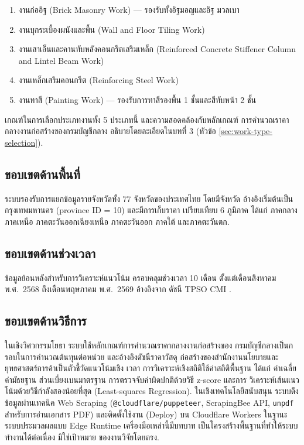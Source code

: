 \begin{enumerate}[leftmargin=2em,itemsep=0.2em]
  \item งานก่ออิฐ (Brick Masonry Work) — รองรับทั้งอิฐมอญและอิฐ
        มวลเบา
  \item งานบุกระเบื้องผนังและพื้น (Wall and Floor Tiling Work)
  \item งานเสาเอ็นและคานทับหลังคอนกรีตเสริมเหล็ก (Reinforced Concrete
        Stiffener Column and Lintel Beam Work)
  \item งานเหล็กเสริมคอนกรีต (Reinforcing Steel Work)
  \item งานทาสี (Painting Work) — รองรับการทาสีรองพื้น 1 ชั้นและสีทับหน้า
        2 ชั้น
\end{enumerate}

เกณฑ์ในการเลือกประเภทงานทั้ง 5 ประเภทนี้ และความสอดคล้องกับหลักเกณฑ์
การคำนวณราคากลางงานก่อสร้างของกรมบัญชีกลาง อธิบายโดยละเอียดในบทที่ 3
(หัวข้อ \ref{sec:work-type-selection}).

\subsection{ขอบเขตด้านพื้นที่}

ระบบรองรับการแยกข้อมูลรายจังหวัดทั้ง 77 จังหวัดของประเทศไทย โดยมีจังหวัด
อ้างอิงเริ่มต้นเป็นกรุงเทพมหานคร (province ID = 10) และมีการเก็บราคา
เปรียบเทียบ 6 ภูมิภาค ได้แก่ ภาคกลาง ภาคเหนือ ภาคตะวันออกเฉียงเหนือ
ภาคตะวันออก ภาคใต้ และภาคตะวันตก.

\subsection{ขอบเขตด้านช่วงเวลา}

ข้อมูลย้อนหลังสำหรับการวิเคราะห์แนวโน้ม ครอบคลุมช่วงเวลา 10 เดือน
ตั้งแต่เดือนสิงหาคม พ.ศ.\ 2568 ถึงเดือนพฤษภาคม พ.ศ.\ 2569 อ้างอิงจาก
ดัชนี TPSO CMI \cite{tpso2569}.

\subsection{ขอบเขตด้านวิธีการ}

ในเชิงวิศวกรรมโยธา ระบบใช้หลักเกณฑ์การคำนวณราคากลางงานก่อสร้างของ
กรมบัญชีกลางเป็นกรอบในการคำนวณต้นทุนต่อหน่วย และอ้างอิงดัชนีราคาวัสดุ
ก่อสร้างของสำนักงานนโยบายและยุทธศาสตร์การค้าเป็นตัวชี้วัดแนวโน้มเชิง
เวลา การวิเคราะห์เชิงสถิติใช้ค่าสถิติพื้นฐาน ได้แก่ ค่าเฉลี่ย ค่ามัธยฐาน
ส่วนเบี่ยงเบนมาตรฐาน การตรวจจับค่าผิดปกติด้วยวิธี z-score และการ
วิเคราะห์เส้นแนวโน้มด้วยวิธีกำลังสองน้อยที่สุด (Least-squares Regression).
ในเชิงเทคโนโลยีสนับสนุน ระบบดึงข้อมูลผ่านเทคนิค Web Scraping
(\texttt{@cloudflare/puppeteer}, ScrapingBee API, \texttt{unpdf}
สำหรับการอ่านเอกสาร PDF) และติดตั้งใช้งาน (Deploy) บน Cloudflare
Workers ในฐานะระบบประมวลผลแบบ Edge Runtime เครื่องมือเหล่านี้มีบทบาท
เป็นโครงสร้างพื้นฐานที่ทำให้ระบบทำงานได้ต่อเนื่อง มิใช่เป้าหมาย
ของงานวิจัยโดยตรง.

